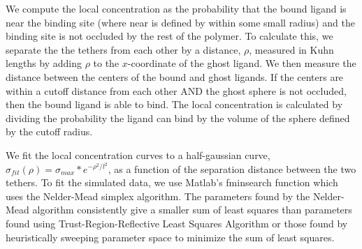 \documentclass[../../AdvancementSummary.tex]{subfiles}
\begin{document}
We compute the local concentration as the probability that the bound ligand is near the binding site (where near is defined by within some small radius) and the binding site is not occluded by the rest of the polymer. To calculate this, we separate the the tethers from each other by a distance, $\rho$, measured in Kuhn lengths by adding $\rho$ to the $x$-coordinate of the ghost ligand. We then measure the distance between the centers of the bound and ghost ligands. If the centers are within a cutoff distance from each other AND the ghost sphere is not occluded, then the bound ligand is able to bind.  The local concentration is calculated by dividing the probability the ligand can bind by the volume of the sphere defined by the cutoff radius.


We fit the local concentration curves to a half-gaussian curve, $\sigma_{fit}(\rho) = \sigma_{max}*e^{-\rho^2/l^2}$, as a function of the separation distance between the two tethers. To fit the simulated data, we use Matlab's fminsearch function which uses the Nelder-Mead simplex algorithm. The parameters found by the Nelder-Mead algorithm consistently give a smaller sum of least squares than parameters found using Trust-Region-Reflective Least Squares Algorithm or those found by heuristically sweeping parameter space to minimize the sum of least squares.
\end{document}
